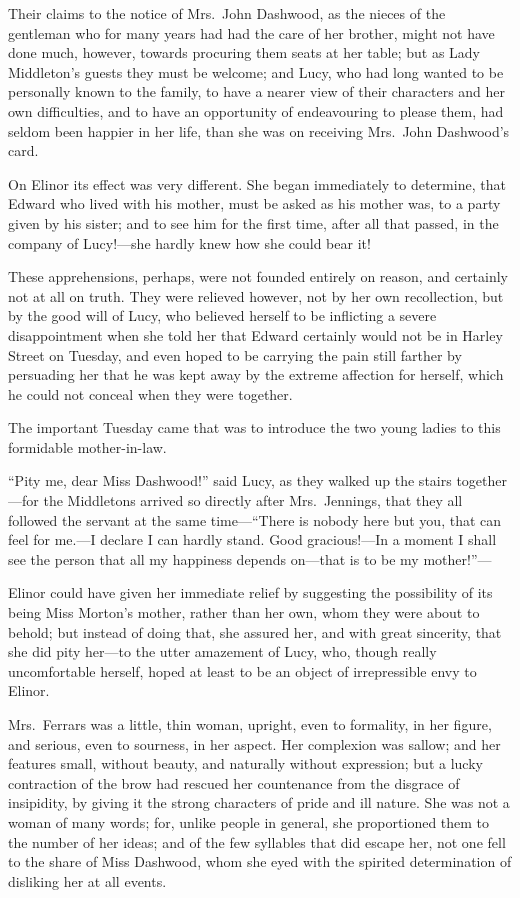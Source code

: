 Their claims to the notice of Mrs.\ John Dashwood,
as the nieces of the gentleman who for many years had
had the care of her brother, might not have done much,
however, towards procuring them seats at her table;
but as Lady Middleton's guests they must be welcome; and Lucy,
who had long wanted to be personally known to the family,
to have a nearer view of their characters and her own
difficulties, and to have an opportunity of endeavouring
to please them, had seldom been happier in her life,
than she was on receiving Mrs.\ John Dashwood's card.

On Elinor its effect was very different.  She began
immediately to determine, that Edward who lived with
his mother, must be asked as his mother was, to a party
given by his sister; and to see him for the first time,
after all that passed, in the company of Lucy!---she hardly
knew how she could bear it!

These apprehensions, perhaps, were not founded
entirely on reason, and certainly not at all on truth.
They were relieved however, not by her own recollection,
but by the good will of Lucy, who believed herself to be
inflicting a severe disappointment when she told her
that Edward certainly would not be in Harley Street on Tuesday,
and even hoped to be carrying the pain still farther
by persuading her that he was kept away by the extreme
affection for herself, which he could not conceal when they
were together.

The important Tuesday came that was to introduce
the two young ladies to this formidable mother-in-law.

``Pity me, dear Miss Dashwood!'' said Lucy, as they
walked up the stairs together---for the Middletons arrived
so directly after Mrs.\ Jennings, that they all followed
the servant at the same time---``There is nobody here but
you, that can feel for me.---I declare I can hardly stand.
Good gracious!---In a moment I shall see the person that all
my happiness depends on---that is to be my mother!''---%

Elinor could have given her immediate relief
by suggesting the possibility of its being Miss Morton's mother,
rather than her own, whom they were about to behold;
but instead of doing that, she assured her, and with
great sincerity, that she did pity her---to the utter
amazement of Lucy, who, though really uncomfortable herself,
hoped at least to be an object of irrepressible envy to Elinor.

Mrs.\ Ferrars was a little, thin woman, upright,
even to formality, in her figure, and serious,
even to sourness, in her aspect.  Her complexion was sallow;
and her features small, without beauty, and naturally
without expression; but a lucky contraction of the brow
had rescued her countenance from the disgrace of insipidity,
by giving it the strong characters of pride and ill nature.
She was not a woman of many words; for, unlike people
in general, she proportioned them to the number of
her ideas; and of the few syllables that did escape her,
not one fell to the share of Miss Dashwood, whom she eyed
with the spirited determination of disliking her at all events.

